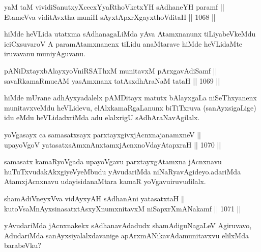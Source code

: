 
\begin{shl}
yaM taM vividiSanutxyXcecxYyaRthoVketxYH sAdhaneYH paramf || \\
EtameVva viditAvx\s tha muniH sAyxtApxrXgayxthoVditaH \hfill || 1068 || 
\end{shl}

\begin{artha}
hiMde heVLida utatxma sAdhanagaLiMda yAva Atamxnanunx tiLiyabeVkeMdu iciCxsuvaroV A paramAtamxnanenx tiLidu anaMtarave hiMde heVLidaMte iruvavanu muniyAguvanu.
\end{artha}


\begin{shl}
pANiDxtayxbAlayxyoVniRSAThxM munitavxM pArxgavAdiSamf || \\
savaRkamaRmucAM yasAmxnanx tatAsxdhAraNaM tataH \hfill || 1069 ||  
\end{shl}

\begin{artha}
hiMde mUrane adhAyxyadalelx pAMDitayx matutx bAlayxgaLa niSeThxyanenx munitavxveMdu heVLidevu, elAlxkamaRgaLanunx biTiTxruva (sanAyxsigaLige) idu eMdu heVLidadxriMda adu elalxrigU sAdhAraNavAgilalx.
\end{artha}


\begin{shl}
yoVgasayx ca samasatxsayx parxtayxgivxjAcnxnajanamxneV || \\
upayoVgoV yatasatxsAmxnAnx\s \s tamxjAcnxnoVdayAtapxraH \hfill || 1070 ||  
\end{shl}

\begin{artha}
samasatx kamaRyoVgada upayoVgavu parxtayxgAtamxna jAcnxnavu huTuTxvudakAkxgiyeVyeMbudu yAvudariMda niNaRyavAgideyo.\break adariMda AtamxjAcnxnavu udayisidanaMtara kamaR yoVgavu\break iruvudilalx.
\end{artha}

\begin{shl}
shamAdiVneyxVva vidAyxyAH sAdhanAni yatasatxtaH || \\
kutoV\s saMnAyxsinasatxtAsxyXnumxnitavxM niSapxrXmANakamf \hfill || 1071 ||  
\end{shl}

\begin{artha}
yAvudariMda jAcnxnakekx sAdhanavAdadudx shamAdiguNagaLeV Agiruvavo, AdudariMda sanAyxsiyalalxdavanige apArxmANikavAda\break munitavxvu elilxMda barabeVku?
\end{artha}

